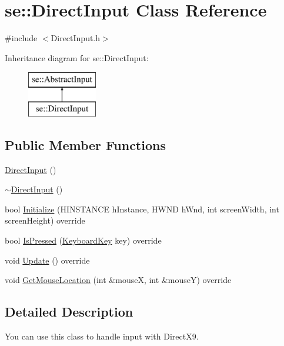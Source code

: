 \hypertarget{classse_1_1_direct_input}{}\section{se\+:\+:Direct\+Input Class Reference}
\label{classse_1_1_direct_input}


{\ttfamily \#include $<$Direct\+Input.\+h$>$}

Inheritance diagram for se\+:\+:Direct\+Input\+:\begin{figure}[H]
\begin{center}
\leavevmode
\includegraphics[height=2.000000cm]{classse_1_1_direct_input}
\end{center}
\end{figure}
\subsection*{Public Member Functions}
\begin{DoxyCompactItemize}
\item 
\mbox{\hyperlink{classse_1_1_direct_input_a2e5e8da67102c194b874fdfa04ca40e4}{Direct\+Input}} ()
\item 
\mbox{\hyperlink{classse_1_1_direct_input_a5ff50cb2afc8d67116856c34169429d0}{$\sim$\+Direct\+Input}} ()
\item 
bool \mbox{\hyperlink{classse_1_1_direct_input_ae8f8c4306ad58f7696548d2c63f01e6f}{Initialize}} (H\+I\+N\+S\+T\+A\+N\+CE h\+Instance, H\+W\+ND h\+Wnd, int screen\+Width, int screen\+Height) override
\item 
bool \mbox{\hyperlink{classse_1_1_direct_input_ad9669e6834c3fcac489050a82beb71f7}{Is\+Pressed}} (\mbox{\hyperlink{namespacese_a94221cf8f238f1eadbe3ac4b8ac7bc71}{Keyboard\+Key}} key) override
\item 
void \mbox{\hyperlink{classse_1_1_direct_input_a863123d7304364a55fd2135f27195500}{Update}} () override
\item 
void \mbox{\hyperlink{classse_1_1_direct_input_a3c097a463a36421a13bf05819c4b681e}{Get\+Mouse\+Location}} (int \&mouseX, int \&mouseY) override
\end{DoxyCompactItemize}


\subsection{Detailed Description}
You can use this class to handle input with Direct\+X9. 

